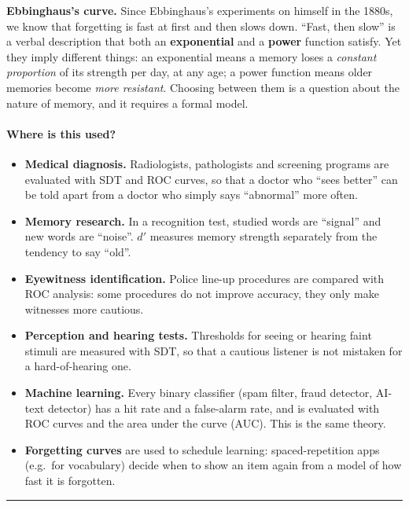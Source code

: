\textbf{Ebbinghaus's curve.} Since Ebbinghaus's experiments on himself
in the 1880s, we know that forgetting is fast at first and then slows
down. ``Fast, then slow'' is a verbal description that both an
\textbf{exponential} and a \textbf{power} function satisfy. Yet they
imply different things: an exponential means a memory loses a
\emph{constant proportion} of its strength per day, at any age; a power
function means older memories become \emph{more resistant}. Choosing
between them is a question about the nature of memory, and it requires a
formal model.

\paragraph{Where is this used?}

\begin{itemize}
\tightlist
\item
  \textbf{Medical diagnosis.} Radiologists, pathologists and screening
  programs are evaluated with SDT and ROC curves, so that a doctor who
  ``sees better'' can be told apart from a doctor who simply says
  ``abnormal'' more often.
\item
  \textbf{Memory research.} In a recognition test, studied words are
  ``signal'' and new words are ``noise''. \(d'\) measures memory
  strength separately from the tendency to say ``old''.
\item
  \textbf{Eyewitness identification.} Police line-up procedures are
  compared with ROC analysis: some procedures do not improve accuracy,
  they only make witnesses more cautious.
\item
  \textbf{Perception and hearing tests.} Thresholds for seeing or
  hearing faint stimuli are measured with SDT, so that a cautious
  listener is not mistaken for a hard-of-hearing one.
\item
  \textbf{Machine learning.} Every binary classifier (spam filter, fraud
  detector, AI-text detector) has a hit rate and a false-alarm rate, and
  is evaluated with ROC curves and the area under the curve (AUC). This
  is the same theory.
\item
  \textbf{Forgetting curves} are used to schedule learning:
  spaced-repetition apps (e.g.~for vocabulary) decide when to show an
  item again from a model of how fast it is forgotten.
\end{itemize}

\begin{center}\rule{0.5\linewidth}{0.5pt}\end{center}

